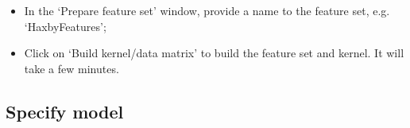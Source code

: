 \begin{itemize}
\begin{itemize}
			
		
	\end{itemize}		
		
	\item In the `Prepare feature set' window, provide a name to the feature set, e.g. `HaxbyFeatures';

	\item Click on `Build kernel/data matrix' to build the feature set and kernel. It will take a few minutes.

\end{itemize}



\subsection{Specify model}

